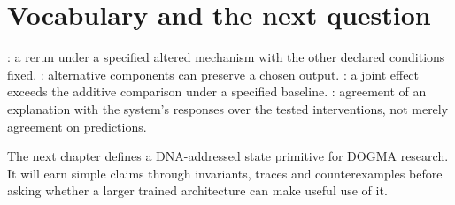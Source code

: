\section{Vocabulary and the next question}
: a rerun under a specified altered mechanism
with the other declared conditions fixed. : alternative
components can preserve a chosen output. : a joint effect
exceeds the additive comparison under a specified baseline.
: agreement of an explanation with the system's
responses over the tested interventions, not merely agreement on predictions.

The next chapter defines a DNA-addressed state primitive for DOGMA research.
It will earn simple claims through invariants, traces and counterexamples
before asking whether a larger trained architecture can make useful use of it.
